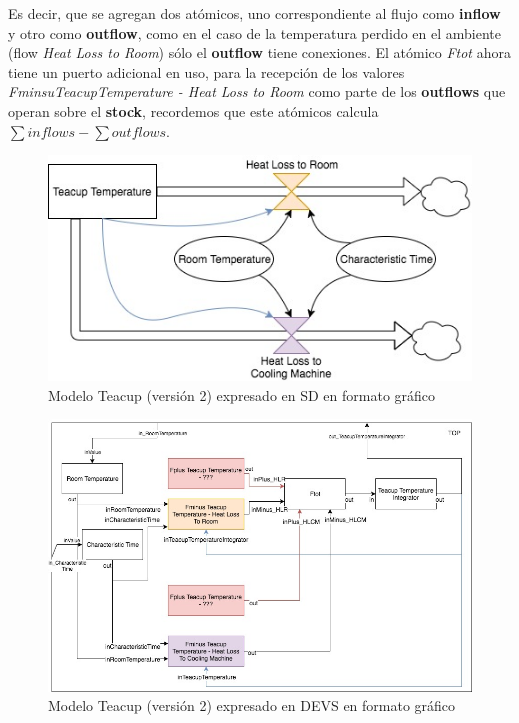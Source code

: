 Es decir, que se agregan dos atómicos, uno correspondiente al flujo como \textbf{inflow} y otro como \textbf{outflow}, como en el caso de la temperatura perdido en el ambiente (flow \textit{Heat Loss to Room}) sólo el \textbf{outflow} tiene conexiones. El atómico \textit{Ftot} ahora tiene un puerto adicional en uso, para la recepción de los valores \textit{FminsuTeacupTemperature - Heat Loss to Room} como parte de los \textbf{outflows} que operan sobre el \textbf{stock}, recordemos que este atómicos calcula $\sum inflows - \sum outflows $.

\begin{figure}[!h]
\centering
\includegraphics[scale=0.4]{imagenes/Teacup_sd_2}
\caption{Modelo Teacup (versión 2) expresado en SD en formato gráfico}
\label{fig:Teacup_sd_2}
\end{figure}

\begin{figure}[!h]
\centering
\includegraphics[scale=0.4]{imagenes/Teacup_devs_flattened_2}
\caption{Modelo Teacup (versión 2) expresado en DEVS en formato gráfico}
\label{fig:Teacup_devs_flattened_2}
\end{figure}

